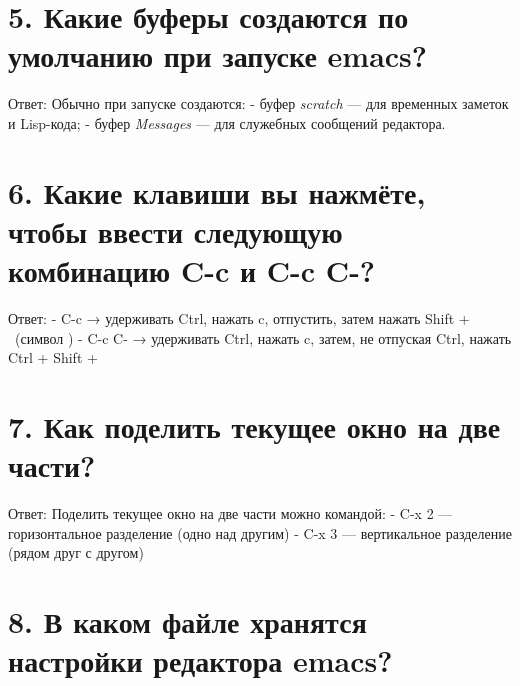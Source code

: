 \documentclass[
  english,
  russian,
  12pt,
  a4paper,
]{scrreprt}
\begin{document}
\section{5. Какие буферы создаются по умолчанию при запуске
emacs?}\label{ux43aux430ux43aux438ux435-ux431ux443ux444ux435ux440ux44b-ux441ux43eux437ux434ux430ux44eux442ux441ux44f-ux43fux43e-ux443ux43cux43eux43bux447ux430ux43dux438ux44e-ux43fux440ux438-ux437ux430ux43fux443ux441ux43aux435-emacs}

Ответ: Обычно при запуске создаются: - буфер \emph{scratch} --- для
временных заметок и Lisp-кода; - буфер \emph{Messages} --- для служебных
сообщений редактора.

\section{6. Какие клавиши вы нажмёте, чтобы ввести следующую комбинацию
C-c \textbar{} и C-c
C-\textbar?}\label{ux43aux430ux43aux438ux435-ux43aux43bux430ux432ux438ux448ux438-ux432ux44b-ux43dux430ux436ux43cux451ux442ux435-ux447ux442ux43eux431ux44b-ux432ux432ux435ux441ux442ux438-ux441ux43bux435ux434ux443ux44eux449ux443ux44e-ux43aux43eux43cux431ux438ux43dux430ux446ux438ux44e-c-c-ux438-c-c-c-}

Ответ: - C-c \textbar{} → удерживать Ctrl, нажать c, отпустить, затем
нажать Shift + ~(символ \textbar) - C-c C-\textbar{} → удерживать Ctrl,
нажать c, затем, не отпуская Ctrl, нажать Ctrl + Shift +\\

\section{7. Как поделить текущее окно на две
части?}\label{ux43aux430ux43a-ux43fux43eux434ux435ux43bux438ux442ux44c-ux442ux435ux43aux443ux449ux435ux435-ux43eux43aux43dux43e-ux43dux430-ux434ux432ux435-ux447ux430ux441ux442ux438}

Ответ: Поделить текущее окно на две части можно командой: - C-x 2 ---
горизонтальное разделение (одно над другим) - C-x 3 --- вертикальное
разделение (рядом друг с другом)

\section{8. В каком файле хранятся настройки редактора
emacs?}\label{ux432-ux43aux430ux43aux43eux43c-ux444ux430ux439ux43bux435-ux445ux440ux430ux43dux44fux442ux441ux44f-ux43dux430ux441ux442ux440ux43eux439ux43aux438-ux440ux435ux434ux430ux43aux442ux43eux440ux430-emacs}
\end{document}
